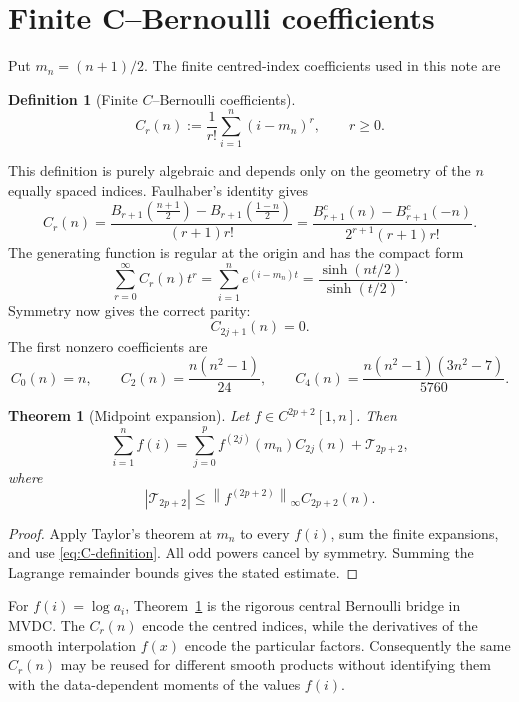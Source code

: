 \documentclass[11pt,a4paper]{article}
\newtheorem{theorem}{Theorem}
\newtheorem{definition}{Definition}
\begin{document}
\section{Finite C--Bernoulli coefficients}

Put \(m_n=(n+1)/2\).  The finite centred-index coefficients used in this
note are
\begin{definition}[Finite \(C\)--Bernoulli coefficients]
\begin{equation}\label{eq:C-definition}
  \boxed{\;
  C_r(n):=\frac1{r!}\sum_{i=1}^{n}(i-m_n)^r,\qquad r\ge0.\;}
\end{equation}
\end{definition}
This definition is purely algebraic and depends only on the geometry of
the \(n\) equally spaced indices.  Faulhaber's identity gives
\begin{equation}\label{eq:C-bernoulli}
  C_r(n)
  =
  \frac{
    B_{r+1}\!\left(\frac{n+1}{2}\right)
    -B_{r+1}\!\left(\frac{1-n}{2}\right)}
  {(r+1)r!}
  =
  \frac{B_{r+1}^c(n)-B_{r+1}^c(-n)}
  {2^{r+1}(r+1)r!}.
\end{equation}
The generating function is regular at the origin and has the compact
form
\begin{equation}\label{eq:C-generating}
  \boxed{\;
  \sum_{r=0}^{\infty}C_r(n)t^r
  =\sum_{i=1}^{n}e^{(i-m_n)t}
  =\frac{\sinh(nt/2)}{\sinh(t/2)}.\;}
\end{equation}
Symmetry now gives the correct parity:
\[
  C_{2j+1}(n)=0.
\]
The first nonzero coefficients are
\[
  C_0(n)=n,\qquad
  C_2(n)=\frac{n(n^2-1)}{24},\qquad
  C_4(n)=\frac{n(n^2-1)(3n^2-7)}{5760}.
\]

\begin{theorem}[Midpoint expansion]\label{thm:midpoint}
Let \(f\in C^{2p+2}[1,n]\).  Then
\begin{equation}\label{eq:midpoint}
  \sum_{i=1}^{n}f(i)
  =
  \sum_{j=0}^{p}f^{(2j)}(m_n)C_{2j}(n)
  +\mathcal T_{2p+2},
\end{equation}
where
\[
  |\mathcal T_{2p+2}|
  \le
  \left\|f^{(2p+2)}\right\|_{\infty}
  C_{2p+2}(n).
\]
\end{theorem}
\begin{proof}
Apply Taylor's theorem at \(m_n\) to every \(f(i)\), sum the finite
expansions, and use \eqref{eq:C-definition}.  All odd powers cancel by
symmetry.  Summing the Lagrange remainder bounds gives the stated
estimate.
\end{proof}

For \(f(i)=\log a_i\), Theorem~\ref{thm:midpoint} is the rigorous
central Bernoulli bridge in MVDC.  The \(C_r(n)\) encode the centred
indices, while the derivatives of the smooth interpolation \(f(x)\)
encode the particular factors.  Consequently the same \(C_r(n)\) may
be reused for different smooth products without identifying them with
the data-dependent moments of the values \(f(i)\).
\end{document}
